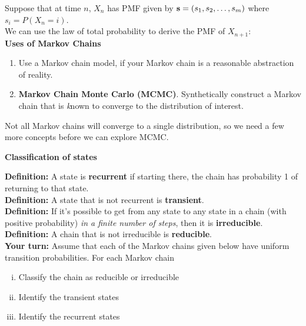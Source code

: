 \documentclass[11pt]{article}\usepackage[]{graphicx}\usepackage[]{color}
\begin{document}
Suppose that at time $n$, $X_n$ has PMF given by ${\bf s} = (s_1, s_2, \ldots, s_m)$ where $s_i = P(X_n = i)$.\\

We can use the law of total probability to derive the PMF of $X_{n+1}$:\\[2.5in]

{\bf Uses of Markov Chains}\\

\begin{enumerate}
\item Use a Markov chain model, if your Markov chain is a reasonable abstraction of reality.\\

\item {\bf Markov Chain Monte Carlo (MCMC)}. Synthetically construct a Markov chain that is {\emph known} to converge to the distribution of interest.\\
\end{enumerate}

Not all Markov chains will converge to a single distribution, so we need a few more concepts before we can explore MCMC.

\clearpage

{\bf Classification of states}

{\bf Definition:} A state is {\bf recurrent} if starting there, the chain has probability 1 of returning to that state.\\

{\bf Definition:} A state that is not recurrent is {\bf transient}.\\

{\bf Definition:} If it's possible to get from any state to any state in a chain (with positive probability) \emph{in a finite number of steps}, then  it is {\bf irreducible}.\\

{\bf Definition:} A chain that is not irreducible is {\bf reducible}.\\


{\bf Your turn:} Assume that each of the Markov chains given below have uniform transition probabilities. For each Markov chain

\begin{enumerate}[i.]
\item Classify the chain as reducible or irreducible
\item Identify the transient states
\item Identify the recurrent states
\end{enumerate}
\end{document}
